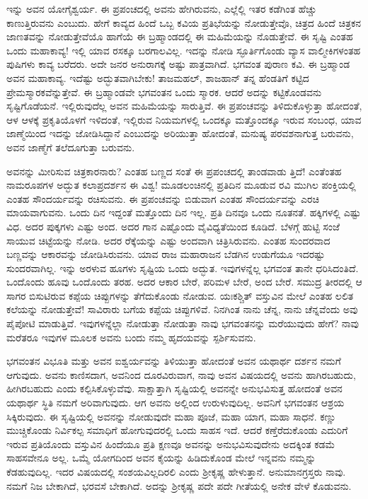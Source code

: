 ಇನ್ನು ಅವನ ಯೋಗೈಶ್ವರ್ಯ. ಈ ಪ್ರಪಂಚದಲ್ಲಿ ಅವನು ಹೇಗಿರುವನು, ಎಲ್ಲೆಲ್ಲಿ ಇತರ ಕಡೆಗಿಂತ ಹೆಚ್ಚು ಕಾಣುತ್ತಿರುವನು ಎಂಬುದು. ಹೇಗೆ ಕಾವ್ಯದ ಹಿಂದೆ ಒಬ್ಬ ಕವಿಯ ಪ್ರತಿಭೆಯನ್ನು ನೋಡುತ್ತೇವೊ, ಚಿತ್ರದ ಹಿಂದೆ ಚಿತ್ರಕನ ಜಾಣತವನ್ನು ನೋಡುತ್ತೇವೆಯೊ ಹಾಗೆಯೆ ಈ ಬ್ರಹ್ಮಾಂಡದಲ್ಲಿ ಈ ಮಹಿಮೆಯನ್ನು ನೊಡುತ್ತೇವೆ. ಈ ಸೃಷ್ಟಿ ಎಂತಹ ಒಂದು ಮಹಾಕಾವ್ಯ! ಇಲ್ಲಿ ಯಾವ ರಸಕ್ಕೂ ಬರಗಾಲವಿಲ್ಲ. ಇದನ್ನು ನೋಡಿ ಸ್ಫೂರ್ತಿಗೊಂಡು ವ್ಯಾಸ ವಾಲ್ಮೀಕಿಗಳಂತಹ ಪುಷಿಗಳು ಕಾವ್ಯ ಬರೆದರು. ಅದೇ ಜನರ ಅನುರಾಗಕ್ಕೆ ಅಷ್ಟು ಪಾತ್ರವಾಗಿದೆ. ಭಗವಂತ ಪುರಾಣ ಕವಿ. ಈ ಬ್ರಹ್ಮಾಂಡ ಅವನ ಮಹಾಕಾವ್ಯ. ಇದೆಷ್ಟು ಅದ್ಭುತವಾಗಿಬೇಕು! ತಾಜಮಹಲ್, ಶಾಜಹಾನ್ ತನ್ನ ಹೆಂಡತಿಗೆ ಕಟ್ಟಿದ ಪ್ರೇಮಸ್ಮಾರಕವೆನ್ನುತ್ತೇವೆ. ಈ ಬ್ರಹ್ಮಾಂಡವೇ ಭಗವಂತನ ಒಂದು ಸ್ಮಾರಕ. ಆದರೆ ಅದನ್ನು ಕಟ್ಟಿಕೊಂಡವನು ಸೃಷ್ಟಿಗೊಡೆಯನೆ. ಇಲ್ಲಿರುವುದೆಲ್ಲ ಅವನ ಮಹಿಮೆಯನ್ನು ಸಾರುತ್ತಿವೆ. ಈ ಪ್ರಪಂಚವನ್ನು ತಿಳಿದುಕೊಳ್ಳುತ್ತಾ ಹೋದಂತೆ, ಆಳ ಆಳಕ್ಕೆ ಪ್ರಕೃತಿಯೊಳಗೆ ಇಳಿದಂತೆ, ಇಲ್ಲಿರುವ ನಿಯಮಗಳಲ್ಲಿ ಒಂದಕ್ಕೂ ಮತ್ತೊಂದಕ್ಕೂ ಇರುವ ಸಂಬಂಧ, ಯಾವ ಜಾಣ್ಮೆಯಿಂದ ಇದನ್ನು ಜೋಡಿಸಿದ್ದಾನೆ ಎಂಬುದನ್ನು ಅರಿಯುತ್ತಾ ಹೋದಂತೆ, ಮನುಷ್ಯ ಪರವಶನಾಗುತ್ತ ಬರುವನು, ಅವನ ಜಾಣ್ಮೆಗೆ ತಲೆದೂಗುತ್ತಾ ಬರುವನು.

ಅವನನ್ನು ಮೀರಿಸುವ ಚಿತ್ರಕಾರನಾರು? ಎಂತಹ ಬಣ್ಣದ ಸಂತೆ ಈ ಪ್ರಪಂಚದಲ್ಲಿ ತಾಂಡವಾಡು ತ್ತಿದೆ! ಎಂತೆಂತಹ ನಾಮರೂಪಗಳ ಅದ್ಭುತ ಕಲಾಪ್ರದರ್ಶನ ಈ ವಿಶ್ವ! ಮೂಡಲಂಚಿನಲ್ಲಿ ಪ್ರತಿದಿನ ಮೂಡುವ ರವಿ ಮುಗಿಲ ಪಂಕ್ತಿಯಲ್ಲಿ ಎಂತಹ ಸೌಂದರ್ಯವನ್ನು ರಚಿಸುವನು. ಈ ಪ್ರಪಂಚವನ್ನು ಬಿಡುವಾಗ ಎಂತಹ ಸೌಂದರ್ಯವನ್ನು ಎರಚಿ ಮಾಯವಾಗುವನು. ಒಂದು ದಿನ ಇದ್ದಂತೆ ಮತ್ತೊಂದು ದಿನ ಇಲ್ಲ. ಪ್ರತಿ ದಿನವೂ ಒಂದು ನೂತನತೆ. ಹಕ್ಕಿಗಳಲ್ಲಿ ಎಷ್ಟು ವಿಧ. ಅದರ ಪುಕ್ಕಗಳು ಎಷ್ಟು ಅಂದ. ಅದರ ಗಾನ ಎಷ್ಟೊಂದು ವೈವಿಧ್ಯತೆಯಿಂದ ಕೂಡಿದೆ. ಬೆಳಗ್ಗೆ ಹುಟ್ಟಿ ಸಂಜೆ ಸಾಯುವ ಚಿಟ್ಟೆಯನ್ನು ನೋಡಿ. ಅದರ ರೆಕ್ಕೆಯನ್ನು ಎಷ್ಟು ಅಂದವಾಗಿ ಚಿತ್ರಿಸಿರುವನು. ಎಂತಹ ಸುಂದರವಾದ ಬಣ್ಣವನ್ನು ಆಕಾರವನ್ನು ಜೋಡಿಸಿರುವನು. ಯಾವ ರಾಜ ಮಹಾರಾಜನ ಬೆಡಗಿನ ಉಡುಗೆಯೂ ಇದರಷ್ಟು ಸುಂದರವಾಗಿಲ್ಲ. ಇನ್ನು ಅರಳುವ ಹೂಗಳು ಸೃಷ್ಟಿಯ ಒಂದು ಅದ್ಭುತ. ಇವುಗಳನ್ನೆಲ್ಲ ಭಗವಂತ ತಾನೇ ಧರಿಸಿದಂತಿದೆ. ಒಂದೊಂದು ಹೂವು ಒಂದೊಂದು ತರಹ. ಅದರ ಆಕಾರ ಬೇರೆ, ಪರಿಮಳ ಬೇರೆ, ಅಂದ ಬೇರೆ. ಸಮುದ್ರ ತೀರದಲ್ಲಿ ಆ ಸಾಗರ ಬಿಸುಟಿರುವ ಕಪ್ಪೆಯ ಚಿಪ್ಪುಗಳನ್ನು ತೆಗೆದುಕೊಂಡು ನೋಡುವ. ಯಃಕಶ್ಚಿತ್ ವಸ್ತುವಿನ ಮೇಲೆ ಎಂತಹ ಲಲಿತ ಕಲೆಯನ್ನು ನೋಡುತ್ತೇವೆ! ಸಾವಿರಾರು ಬಗೆಯ ಕಪ್ಪೆಯ ಚಿಪ್ಪುಗಳಿವೆ. ನಿನಗಿಂತ ನಾನು ಚೆನ್ನ, ನಾನು ಚೆನ್ನವೆಂದು ಅವು ಪೈಪೋಟಿ ಮಾಡುತ್ತಿವೆ. ಇವುಗಳನ್ನೆಲ್ಲಾ ನೋಡುತ್ತಾ ನೋಡುತ್ತಾ ನಾವು ಭಗವಂತನನ್ನು ಮರೆಯುವುದು ಹೇಗೆ? ನಾವು ಮರೆತರೂ ಇವುಗಳ ಮೂಲಕ ಅವನು ಬಂದು ನಮ್ಮ ಹೃದಯವನ್ನು ಸ್ಪರ್ಶಿಸುವನು.

ಭಗವಂತನ ವಿಭೂತಿ ಮತ್ತು ಅವನ ಐಶ್ವರ್ಯವನ್ನು ತಿಳಿಯುತ್ತಾ ಹೋದಂತೆ ಅವನ ಯಥಾರ್ಥ ದರ್ಶನ ನಮಗೆ ಆಗುವುದು. ಅವನು ಕಾಣಿಸದಾಗ, ಅವನಿಂದ ದೂರವಿರುವಾಗ, ನಾವು ಅವನ ವಿಷಯದಲ್ಲಿ ಅವನು ಹಾಗಿರಬಹುದು, ಹೀಗಿರಬಹುದು ಎಂದು ಕಲ್ಪಿಸಿಕೊಳ್ಳುವೆವು. ಸಾಕ್ಷಾತ್ತಾಗಿ ಸೃಷ್ಟಿಯಲ್ಲಿ ಅವನನ್ನೇ ಅನುಭವಿಸುತ್ತ ಹೋದಂತೆ ಅವನ ಯಥಾರ್ಥ ಸ್ಥಿತಿ ನಮಗೆ ಅರಿವಾಗುವುದು. ಆಗ ಅವನು ಅಲ್ಲಿಂದ ಉರುಳುವುದಿಲ್ಲ. ಅವನಿಗೆ ಭಗವಂತನ ಆಶ್ರಯ ಸಿಕ್ಕಿರುವುದು. ಈ ಸೃಷ್ಟಿಯಲ್ಲಿ ಅವನನ್ನು ನೋಡುವುದೇ ಮಹಾ ಪೂಜೆ, ಮಹಾ ಯಾಗ, ಮಹಾ ಸಾಧನೆ. ಕಣ್ಣು ಮುಚ್ಚಿಕೊಂಡು ನಿರ್ವಿಕಲ್ಪ ಸಮಾಧಿಗೆ ಹೋಗುವುದರಲ್ಲಿ ಒಂದು ಸಾಹಸ ಇದೆ. ಆದರೆ ಕಣ್ತೆರೆದುಕೊಂಡು ಎದುರಿಗೆ ಇರುವ ಪ್ರತಿಯೊಂದು ವಸ್ತುವಿನ ಹಿಂದೆಯೂ ಪ್ರತಿ ಕ್ಷಣವೂ ಅವನನ್ನು ಅನುಭವಿಸುವುದೇನು ಅದಕ್ಕಿಂತ ಕಡಮೆ ಸಾಹಸವೇನೂ ಅಲ್ಲ. ಒಮ್ಮೆ ಯೋಗದಿಂದ ಅವನ ಕೈಯನ್ನು ಹಿಡಿದುಕೊಂಡ ಮೇಲೆ ಇನ್ನವನು ನಮ್ಮನ್ನು ಕೆಡಹುವುದಿಲ್ಲ. ಇದರ ವಿಷಯದಲ್ಲಿ ಸಂಶಯವಿಲ್ಲದಿರಲಿ ಎಂದು ಶ‍್ರೀಕೃಷ್ಣ ಹೇಳುತ್ತಾನೆ. ಅನುಮಾನಗ್ರಸ್ತರು ನಾವು. ನಮಗೆ ನಿಜ ಬೇಕಾಗಿದೆ, ಭರವಸೆ ಬೇಕಾಗಿದೆ. ಅದನ್ನು ಶ‍್ರೀಕೃಷ್ಣ ಪದೇ ಪದೇ ಗೀತೆಯಲ್ಲಿ ಅನೇಕ ವೇಳೆ ಕೊಡುವನು.


